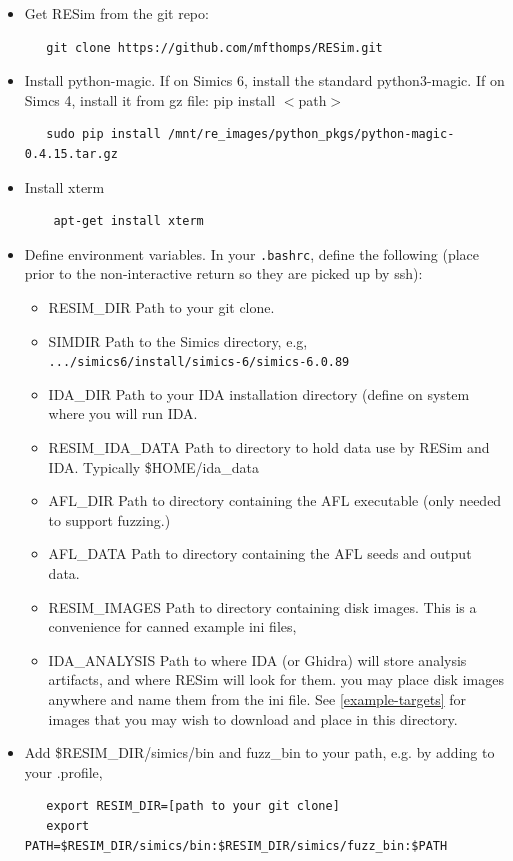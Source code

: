 \documentclass[titlepage]{article}
\begin{document}
\begin{itemize}
\item Get RESim from the git repo:
\begin{verbatim}
   git clone https://github.com/mfthomps/RESim.git
\end{verbatim}
\item Install python-magic.  If on Simics 6, install the standard python3-magic.  If on Simcs 4, install it from gz file:  pip install $<$path$>$
\begin{verbatim}
   sudo pip install /mnt/re_images/python_pkgs/python-magic-0.4.15.tar.gz
\end{verbatim}
\item Install xterm
\begin{verbatim}
    apt-get install xterm
\end{verbatim}
\item Define environment variables.  In your {\tt .bashrc}, define the following (place prior to the 
non-interactive return so they are picked up by ssh):
\begin{itemize}
\item RESIM\_DIR  Path to your git clone.
\item SIMDIR  Path to the Simics directory, e.g, {\tt .../simics6/install/simics-6/simics-6.0.89}
\item IDA\_DIR Path to your IDA installation directory (define on system where you will run IDA.
\item RESIM\_IDA\_DATA Path to directory to hold data use by RESim and IDA.  Typically \$HOME/ida\_data
\item AFL\_DIR Path to directory containing the AFL executable (only needed to support fuzzing.)
\item AFL\_DATA Path to directory containing the AFL seeds and output data.
\item RESIM\_IMAGES Path to directory containing disk images.  This is a convenience for canned example ini files,
\item IDA\_ANALYSIS Path to where IDA (or Ghidra) will store analysis artifacts, and where RESim will look for them.
you may place disk images anywhere and name them from the ini file.  See \ref{example-targets} for images that you may
wish to download and place in this directory.
\end{itemize}
\item Add \$RESIM\_DIR/simics/bin and fuzz\_bin to your path, e.g. by adding to your .profile,
\begin{verbatim}
   export RESIM_DIR=[path to your git clone]
   export PATH=$RESIM_DIR/simics/bin:$RESIM_DIR/simics/fuzz_bin:$PATH
\end{verbatim}


\end{itemize}
\end{document}
